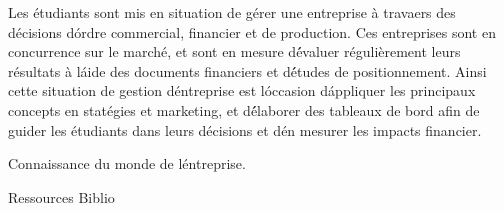\vfill

{
Les étudiants sont mis en situation de gérer une entreprise à travaers des décisions d\'ordre commercial, financier et de production. Ces entreprises sont en concurrence sur le marché, et sont en mesure d\'évaluer régulièrement leurs résultats à l\'aide des documents financiers et d\'études de positionnement. Ainsi cette situation de gestion d\'entreprise est l\'occasion d\'appliquer les principaux concepts en statégies et marketing, et d\'élaborer des tableaux de bord afin de guider les étudiants dans leurs décisions et d\'en mesurer les impacts financier. 
} 
{} 
{\begin{itemize}
\ObjItem Connaissance du monde de l\'entreprise.
\end{itemize} 
} 
{Ressources} 
{Biblio} 
 
\vfill

